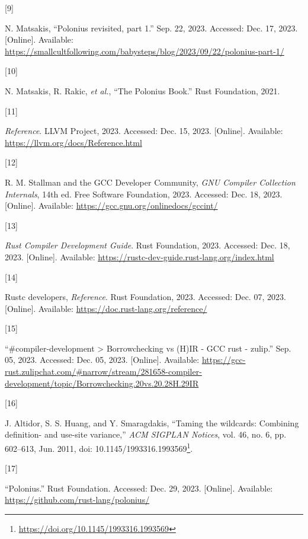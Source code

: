 \documentclass[
  11pt,
  twoside,symmetric]{report}
\newlength{\cslhangindent}
\newlength{\csllabelwidth}
\newenvironment{CSLReferences}[2] %
 {\begin{list}{}{%
  \setlength{\itemindent}{0pt}
  \setlength{\leftmargin}{0pt}
  \setlength{\parsep}{0pt}
  \ifodd #1
   \setlength{\leftmargin}{\cslhangindent}
   \setlength{\itemindent}{-1\cslhangindent}
  \fi
  \setlength{\itemsep}{#2\baselineskip}}}
 {\end{list}}
\newcommand{\CSLLeftMargin}[1]{\parbox[t]{\csllabelwidth}{\strut#1\strut}}
\newcommand{\CSLRightInline}[1]{\parbox[t]{\linewidth - \csllabelwidth}{\strut#1\strut}}
\DeclareRobustCommand{\href}[2]{#2\footnote{\url{#1}}}
\begin{document}
\begin{CSLReferences}{0}{0}
\CSLLeftMargin{{[}9{]} }%
\CSLRightInline{N. Matsakis, {``Polonius revisited, part 1.''} Sep. 22,
2023. Accessed: Dec. 17, 2023. {[}Online{]}. Available:
\url{https://smallcultfollowing.com/babysteps/blog/2023/09/22/polonius-part-1/}}

\CSLLeftMargin{{[}10{]} }%
\CSLRightInline{N. Matsakis, R. Rakic, \emph{et al.}, {``{T}he
{P}olonius {B}ook.''} Rust Foundation, 2021.}

\CSLLeftMargin{{[}11{]} }%
\CSLRightInline{\emph{Reference}. LLVM Project, 2023. Accessed: Dec. 15,
2023. {[}Online{]}. Available:
\url{https://llvm.org/docs/Reference.html}}

\CSLLeftMargin{{[}12{]} }%
\CSLRightInline{R. M. Stallman and the GCC Developer Community,
\emph{{GNU} {C}ompiler {C}ollection {I}nternals}, 14th ed. Free Software
Foundation, 2023. Accessed: Dec. 18, 2023. {[}Online{]}. Available:
\url{https://gcc.gnu.org/onlinedocs/gccint/}}

\CSLLeftMargin{{[}13{]} }%
\CSLRightInline{\emph{{R}ust {C}ompiler {D}evelopment {G}uide}. Rust
Foundation, 2023. Accessed: Dec. 18, 2023. {[}Online{]}. Available:
\url{https://rustc-dev-guide.rust-lang.org/index.html}}

\CSLLeftMargin{{[}14{]} }%
\CSLRightInline{Rustc developers, \emph{Reference}. Rust Foundation,
2023. Accessed: Dec. 07, 2023. {[}Online{]}. Available:
\url{https://doc.rust-lang.org/reference/}}

\CSLLeftMargin{{[}15{]} }%
\CSLRightInline{{``{\#}{c}ompiler-development \textgreater{}
{B}orrowchecking vs ({H})IR - GCC rust - zulip.''} Sep. 05, 2023.
Accessed: Dec. 05, 2023. {[}Online{]}. Available:
\url{https://gcc-rust.zulipchat.com/\#narrow/stream/281658-compiler-development/topic/Borrowchecking.20vs.20.28H.29IR}}

\CSLLeftMargin{{[}16{]} }%
\CSLRightInline{J. Altidor, S. S. Huang, and Y. Smaragdakis, {``Taming
the wildcards: Combining definition- and use-site variance,''} \emph{ACM
SIGPLAN Notices}, vol. 46, no. 6, pp. 602--613, Jun. 2011, doi:
\href{https://doi.org/10.1145/1993316.1993569}{10.1145/1993316.1993569}.}

\CSLLeftMargin{{[}17{]} }%
\CSLRightInline{{``Polonius.''} Rust Foundation. Accessed: Dec. 29,
2023. {[}Online{]}. Available:
\url{https://github.com/rust-lang/polonius/}}


\end{CSLReferences}
\end{document}
